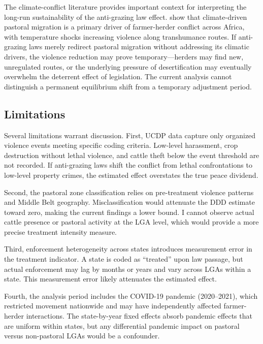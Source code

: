 \documentclass[12pt]{article}
\begin{document}
The climate-conflict literature provides important context for interpreting the long-run sustainability of the anti-grazing law effect. \citet{mcguirk2025transhumant} show that climate-driven pastoral migration is a primary driver of farmer-herder conflict across Africa, with temperature shocks increasing violence along transhumance routes. If anti-grazing laws merely redirect pastoral migration without addressing its climatic drivers, the violence reduction may prove temporary---herders may find new, unregulated routes, or the underlying pressure of desertification may eventually overwhelm the deterrent effect of legislation. The current analysis cannot distinguish a permanent equilibrium shift from a temporary adjustment period.

\subsection{Limitations}

Several limitations warrant discussion. First, UCDP data capture only organized violence events meeting specific coding criteria. Low-level harassment, crop destruction without lethal violence, and cattle theft below the event threshold are not recorded. If anti-grazing laws shift the conflict from lethal confrontations to low-level property crimes, the estimated effect overstates the true peace dividend.

Second, the pastoral zone classification relies on pre-treatment violence patterns and Middle Belt geography. Misclassification would attenuate the DDD estimate toward zero, making the current findings a lower bound. I cannot observe actual cattle presence or pastoral activity at the LGA level, which would provide a more precise treatment intensity measure.

Third, enforcement heterogeneity across states introduces measurement error in the treatment indicator. A state is coded as ``treated'' upon law passage, but actual enforcement may lag by months or years and vary across LGAs within a state. This measurement error likely attenuates the estimated effect.

Fourth, the analysis period includes the COVID-19 pandemic (2020--2021), which restricted movement nationwide and may have independently affected farmer-herder interactions. The state-by-year fixed effects absorb pandemic effects that are uniform within states, but any differential pandemic impact on pastoral versus non-pastoral LGAs would be a confounder.
\end{document}
